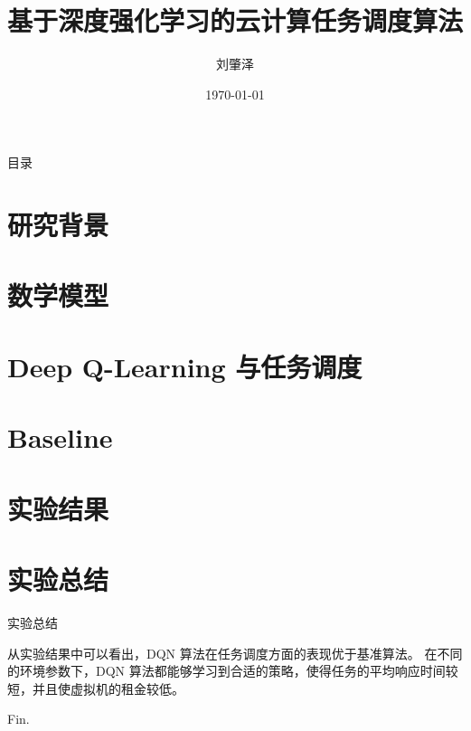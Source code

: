 \documentclass[aspectratio=169, dvipsnames]{beamer}
\title{基于深度强化学习的云计算任务调度算法}
\author{刘肇泽}
\institute{控制与计算机工程学院}
\date{\today}
\begin{document}
\begin{frame}[noframenumbering]

    \titlepage

\end{frame}

\begin{frame}{目录}

    \centering
    \begin{minipage}{0.8\textwidth}
        \tableofcontents
    \end{minipage}

\end{frame}

\section{研究背景}



\section{数学模型}



\section{Deep Q-Learning 与任务调度}



\section{Baseline}



\section{实验结果}



\section{实验总结}

\begin{frame}{实验总结}

    从实验结果中可以看出，DQN 算法在任务调度方面的表现优于基准算法。
    在不同的环境参数下，DQN 算法都能够学习到合适的策略，使得任务的平均响应时间较短，并且使虚拟机的租金较低。

\end{frame}

\begin{frame}

    \centering
    \Huge
    Fin.

\end{frame}
\end{document}
